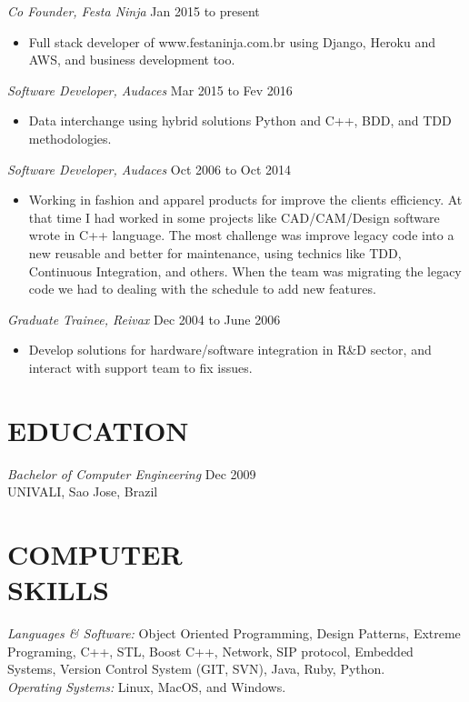 \documentclass[line,margin]{res}
\begin{document}
\begin{resume}
                {\sl Co Founder, Festa Ninja} \hfill Jan 2015 to present \\
                 \begin{itemize}  \itemsep -2pt
                 \item Full stack developer of www.festaninja.com.br using Django, Heroku and AWS, and business development too.
                 \end{itemize}
                {\sl Software Developer, Audaces} \hfill Mar 2015 to Fev 2016 \\
                  \begin{itemize}
                   \item Data interchange using hybrid solutions Python and C++, BDD, and TDD methodologies.
                   \end{itemize}
   {\sl Software Developer, Audaces} \hfill Oct 2006 to Oct 2014 \\
                  \begin{itemize}
                   \item Working in fashion and apparel products for improve the clients efficiency. At that time I had worked in some projects like CAD/CAM/Design software wrote in C++ language. The most challenge was improve legacy code into a new reusable and better for maintenance, using technics like TDD, Continuous Integration, and others. When the team was migrating the legacy code we had to dealing with the schedule to add new features.
                   \end{itemize}
                     {\sl Graduate Trainee, Reivax} \hfill Dec 2004 to June 2006 \\
                  \begin{itemize}
                   \item Develop solutions for hardware/software integration in R\&D sector, and interact with support team to fix issues.
                   \end{itemize}
\section{EDUCATION} {\sl Bachelor of Computer Engineering} \hfill Dec 2009\\
                UNIVALI, Sao Jose, Brazil


\section{COMPUTER \\ SKILLS} {\sl Languages \& Software:} Object Oriented Programming, Design Patterns, Extreme Programing, C++, STL, Boost C++, Network, SIP protocol, Embedded Systems, Version Control System (GIT, SVN), Java, Ruby, Python. \\
                {\sl Operating Systems:} Linux, MacOS, and Windows.


\end{resume}
\end{document}
